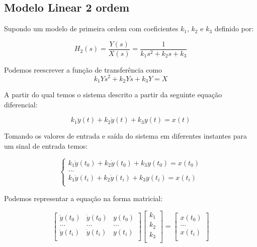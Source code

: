 \documentclass[a4paper,11pt]{article}
\begin{document}
\subsection{Modelo Linear 2 ordem}

Supondo um modelo de primeira ordem com coeficientes $k_1$, $k_2$ e $k_3$ definido por:

\begin{equation}\label{eq:secondordertf}
    H_2(s) = \frac{Y(s)}{X(s)} = \frac{1}{k_1 s^2+ k_2 s+ k_3}
\end{equation}


Podemos reescrever a função de transferência como
\begin{equation}
k_1 Ys^2 + k_2 Ys + k_3 Y  = X
\end{equation}

A partir do qual temos o sistema descrito a partir da seguinte equação diferencial:

\begin{equation}
k_1 \ddot{y}(t) + k_2 \dot{y}(t) + k_3 y(t) = x(t)
\end{equation}

Tomando os valores de entrada e saída do sistema em diferentes instantes para um sinal de entrada temos:

\begin{equation}
\left\{\begin{array}{c}
    k_1 \ddot{y}(t_0) + k_2 \dot{y}(t_0) + k_3 y(t_0) = x(t_0)  \\
    \dots\\
    k_1 \ddot{y}(t_i) + k_2 \dot{y}(t_i) + k_3 y(t_i) = x(t_i)  \\
\end{array} \right.
\end{equation}


Podemos representar a equação na forma matricial:

\begin{equation}
\left[\begin{array}{ccc}
    \ddot{y}(t_0) & \dot{y}(t_0) & y(t_0)\\
    \dots  & \dots & \dots \\
    \ddot{y}(t_i) & \dot{y}(t_i) & y(t_i)\\
\end{array} \right]
\left[\begin{array}{c}
    k_1\\
    k_2\\
    k_3\\
\end{array} \right]
=
\left[\begin{array}{c}
    x(t_0)  \\
    \dots\\
    x(t_i)  \\
\end{array} \right]
\end{equation}
\end{document}
